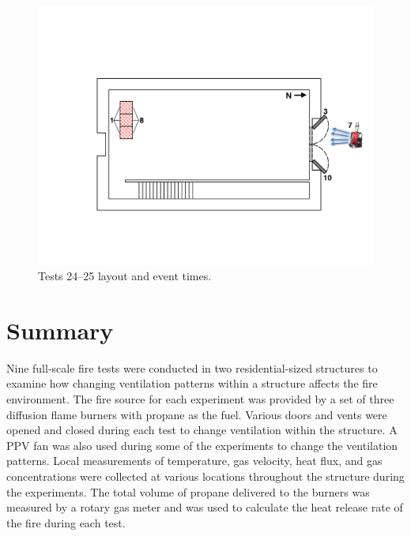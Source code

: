 \documentclass[12pt,oneside]{book}
\begin{document}
\begin{figure}[!ht]
\begin{minipage}[b]{0.9\columnwidth}
	\includegraphics[width=0.95\columnwidth]{../Figures/Floor_Plans/West_Structure_1st_Floor_Test_24}
\end{minipage}
\caption{Tests 24--25 layout and event times.}
\label{fig:west_test_24}
\end{figure}
\clearpage

\chapter{Summary}
\label{chap:Summary}
Nine full-scale fire tests were conducted in two residential-sized structures to examine how changing ventilation patterns within a structure affects the fire environment. The fire source for each experiment was provided by a set of three diffusion flame burners with propane as the fuel. Various doors and vents were opened and closed during each test to change ventilation within the structure. A PPV fan was also used during some of the experiments to change the ventilation patterns. Local measurements of temperature, gas velocity, heat flux, and gas concentrations were collected at various locations throughout the structure during the experiments. The total volume of propane delivered to the burners was measured by a rotary gas meter and was used to calculate the heat release rate of the fire during each test.    



\appendix
\end{document}
